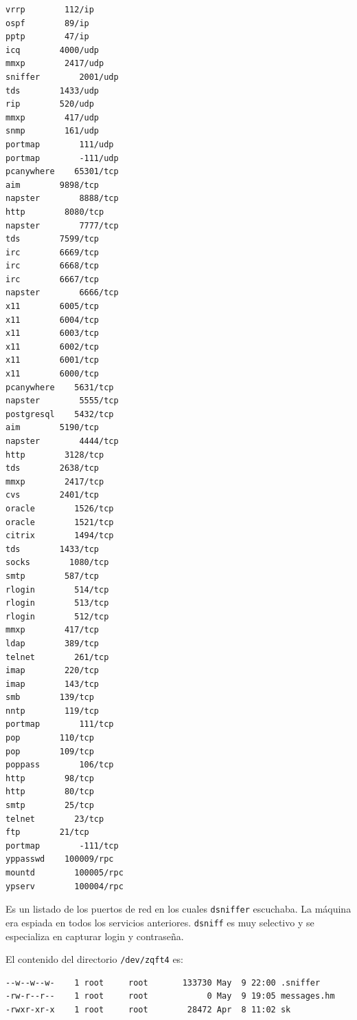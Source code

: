 \vspace{1em}

\begin{lstlisting}[style=terminal]
vrrp        112/ip
ospf        89/ip
pptp        47/ip
icq        4000/udp
mmxp        2417/udp
sniffer        2001/udp
tds        1433/udp
rip        520/udp
mmxp        417/udp
snmp        161/udp
portmap        111/udp
portmap        -111/udp
pcanywhere    65301/tcp
aim        9898/tcp
napster        8888/tcp
http        8080/tcp
napster        7777/tcp
tds        7599/tcp
irc        6669/tcp
irc        6668/tcp
irc        6667/tcp
napster        6666/tcp
x11        6005/tcp
x11        6004/tcp
x11        6003/tcp
x11        6002/tcp
x11        6001/tcp
x11        6000/tcp
pcanywhere    5631/tcp
napster        5555/tcp
postgresql    5432/tcp
aim        5190/tcp
napster        4444/tcp
http        3128/tcp
tds        2638/tcp
mmxp        2417/tcp
cvs        2401/tcp
oracle        1526/tcp
oracle        1521/tcp
citrix        1494/tcp
tds        1433/tcp
socks        1080/tcp
smtp        587/tcp
rlogin        514/tcp
rlogin        513/tcp
rlogin        512/tcp
mmxp        417/tcp
ldap        389/tcp
telnet        261/tcp
imap        220/tcp
imap        143/tcp
smb        139/tcp
nntp        119/tcp
portmap        111/tcp
pop        110/tcp
pop        109/tcp
poppass        106/tcp
http        98/tcp
http        80/tcp
smtp        25/tcp
telnet        23/tcp
ftp        21/tcp
portmap        -111/tcp
yppasswd    100009/rpc
mountd        100005/rpc
ypserv        100004/rpc
\end{lstlisting}

\vspace{1em}

Es un listado de los puertos de red en los cuales \texttt{dsniffer}
escuchaba. La máquina era espiada en todos los servicios
anteriores. \texttt{dsniff} es muy selectivo y se especializa en capturar login
y contraseña.
 

El contenido del directorio \texttt{/dev/zqft4} es:

\vspace{1em}

\begin{lstlisting}[style=terminal]
--w--w--w-    1 root     root       133730 May  9 22:00 .sniffer
-rw-r--r--    1 root     root            0 May  9 19:05 messages.hm
-rwxr-xr-x    1 root     root        28472 Apr  8 11:02 sk
\end{lstlisting}

\vspace{1em}

